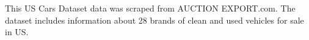 \documentclass[
]{article}
\newenvironment{Shaded}{\begin{snugshade}}{\end{snugshade}}
\newcommand{\FunctionTok}[1]{\textcolor[rgb]{0.00,0.00,0.00}{#1}}
\newcommand{\NormalTok}[1]{#1}
\newcommand{\OtherTok}[1]{\textcolor[rgb]{0.56,0.35,0.01}{#1}}
\newcommand{\SpecialCharTok}[1]{\textcolor[rgb]{0.00,0.00,0.00}{#1}}
\begin{document}
This US Cars Dataset data was scraped from AUCTION EXPORT.com. The
dataset includes information about 28 brands of clean and used vehicles
for sale in US.

\begin{Shaded}
\end{Shaded}
\end{document}
